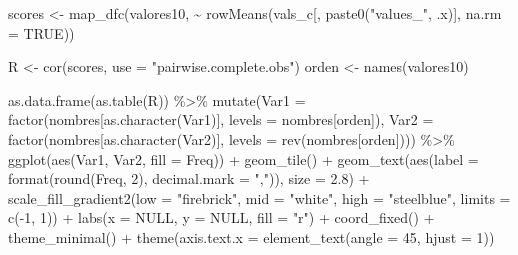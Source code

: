 \documentclass[
  spanish,
  a4paper,
  oneside]{scrbook}
\newenvironment{Shaded}{\begin{snugshade}}{\end{snugshade}}
\newcommand{\AttributeTok}[1]{\textcolor[rgb]{0.40,0.45,0.13}{#1}}
\newcommand{\ConstantTok}[1]{\textcolor[rgb]{0.56,0.35,0.01}{#1}}
\newcommand{\DecValTok}[1]{\textcolor[rgb]{0.68,0.00,0.00}{#1}}
\newcommand{\FloatTok}[1]{\textcolor[rgb]{0.68,0.00,0.00}{#1}}
\newcommand{\FunctionTok}[1]{\textcolor[rgb]{0.28,0.35,0.67}{#1}}
\newcommand{\NormalTok}[1]{\textcolor[rgb]{0.00,0.23,0.31}{#1}}
\newcommand{\OtherTok}[1]{\textcolor[rgb]{0.00,0.23,0.31}{#1}}
\newcommand{\SpecialCharTok}[1]{\textcolor[rgb]{0.37,0.37,0.37}{#1}}
\newcommand{\StringTok}[1]{\textcolor[rgb]{0.13,0.47,0.30}{#1}}
\begin{document}
\begin{Shaded}
\begin{Highlighting}[]
\NormalTok{scores }\OtherTok{\textless{}{-}} \FunctionTok{map\_dfc}\NormalTok{(valores10,}
                  \SpecialCharTok{\textasciitilde{}} \FunctionTok{rowMeans}\NormalTok{(vals\_c[, }\FunctionTok{paste0}\NormalTok{(}\StringTok{"values\_"}\NormalTok{, .x)], }\AttributeTok{na.rm =} \ConstantTok{TRUE}\NormalTok{))}

\NormalTok{R }\OtherTok{\textless{}{-}} \FunctionTok{cor}\NormalTok{(scores, }\AttributeTok{use =} \StringTok{"pairwise.complete.obs"}\NormalTok{)}
\NormalTok{orden }\OtherTok{\textless{}{-}} \FunctionTok{names}\NormalTok{(valores10)}

\FunctionTok{as.data.frame}\NormalTok{(}\FunctionTok{as.table}\NormalTok{(R)) }\SpecialCharTok{\%\textgreater{}\%}
  \FunctionTok{mutate}\NormalTok{(}\AttributeTok{Var1 =} \FunctionTok{factor}\NormalTok{(nombres[}\FunctionTok{as.character}\NormalTok{(Var1)], }\AttributeTok{levels =}\NormalTok{ nombres[orden]),}
         \AttributeTok{Var2 =} \FunctionTok{factor}\NormalTok{(nombres[}\FunctionTok{as.character}\NormalTok{(Var2)], }\AttributeTok{levels =} \FunctionTok{rev}\NormalTok{(nombres[orden]))) }\SpecialCharTok{\%\textgreater{}\%}
  \FunctionTok{ggplot}\NormalTok{(}\FunctionTok{aes}\NormalTok{(Var1, Var2, }\AttributeTok{fill =}\NormalTok{ Freq)) }\SpecialCharTok{+}
  \FunctionTok{geom\_tile}\NormalTok{() }\SpecialCharTok{+}
  \FunctionTok{geom\_text}\NormalTok{(}\FunctionTok{aes}\NormalTok{(}\AttributeTok{label =} \FunctionTok{format}\NormalTok{(}\FunctionTok{round}\NormalTok{(Freq, }\DecValTok{2}\NormalTok{), }\AttributeTok{decimal.mark =} \StringTok{","}\NormalTok{)), }\AttributeTok{size =} \FloatTok{2.8}\NormalTok{) }\SpecialCharTok{+}
  \FunctionTok{scale\_fill\_gradient2}\NormalTok{(}\AttributeTok{low =} \StringTok{"firebrick"}\NormalTok{, }\AttributeTok{mid =} \StringTok{"white"}\NormalTok{, }\AttributeTok{high =} \StringTok{"steelblue"}\NormalTok{,}
                       \AttributeTok{limits =} \FunctionTok{c}\NormalTok{(}\SpecialCharTok{{-}}\DecValTok{1}\NormalTok{, }\DecValTok{1}\NormalTok{)) }\SpecialCharTok{+}
  \FunctionTok{labs}\NormalTok{(}\AttributeTok{x =} \ConstantTok{NULL}\NormalTok{, }\AttributeTok{y =} \ConstantTok{NULL}\NormalTok{, }\AttributeTok{fill =} \StringTok{"r"}\NormalTok{) }\SpecialCharTok{+}
  \FunctionTok{coord\_fixed}\NormalTok{() }\SpecialCharTok{+}
  \FunctionTok{theme\_minimal}\NormalTok{() }\SpecialCharTok{+}
  \FunctionTok{theme}\NormalTok{(}\AttributeTok{axis.text.x =} \FunctionTok{element\_text}\NormalTok{(}\AttributeTok{angle =} \DecValTok{45}\NormalTok{, }\AttributeTok{hjust =} \DecValTok{1}\NormalTok{))}
\end{Highlighting}
\end{Shaded}
\end{document}
